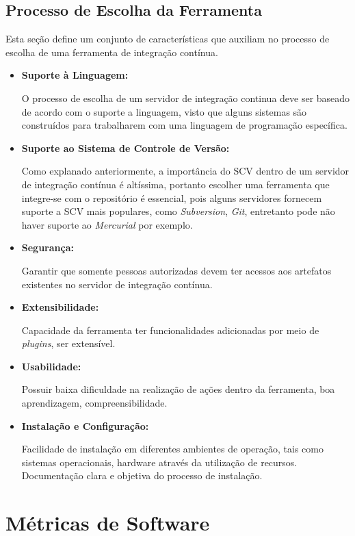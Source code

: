 \subsection{Processo de Escolha da Ferramenta}\label{escolhaFerramenta}
Esta seção define um conjunto de características que auxiliam no processo de escolha de uma ferramenta de integração contínua.
\begin{itemize}
\item {\textbf{Suporte à Linguagem:}}

O processo de escolha de um servidor de integração continua deve ser baseado de acordo com o suporte a linguagem, visto que alguns sistemas são construídos para trabalharem com uma linguagem de programação específica.

\item {\textbf{Suporte ao Sistema de Controle de Versão:}}

Como explanado anteriormente, a importância do SCV dentro de um servidor de integração contínua é altíssima, portanto escolher uma ferramenta que integre-se com o repositório é essencial, pois alguns servidores fornecem suporte a SCV mais populares, como \textit{Subversion}, \textit{Git}, entretanto pode não haver suporte ao \textit{Mercurial} por exemplo.


\item {\textbf{Segurança:}}

Garantir que somente pessoas autorizadas devem ter acessos aos artefatos existentes no servidor de integração contínua.

\item {\textbf{Extensibilidade:}}

Capacidade da ferramenta ter funcionalidades adicionadas por meio de \textit{plugins}, ser extensível.

\item {\textbf{Usabilidade:}}

Possuir baixa dificuldade na realização de ações dentro da ferramenta, boa aprendizagem, compreensibilidade.

\item {\textbf{Instalação e Configuração:}}

Facilidade de instalação em diferentes ambientes de operação, tais como sistemas operacionais, hardware através da utilização de recursos. Documentação clara e objetiva do processo de instalação.


\end{itemize}


\section{Métricas de Software}

